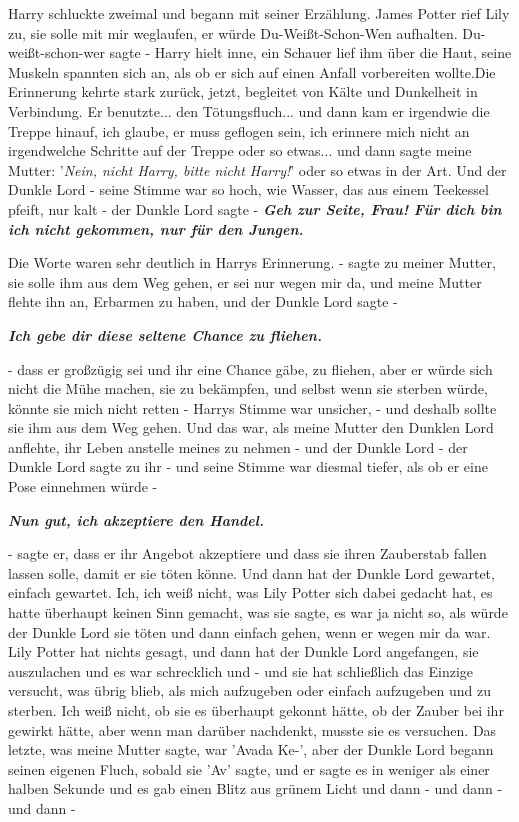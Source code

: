 Harry schluckte zweimal und begann mit seiner Erzählung. \glqq{}James Potter rief
Lily zu, sie solle mit mir weglaufen, er würde Du-Weißt-Schon-Wen aufhalten.
Du-weißt-schon-wer sagte -\grqq{} Harry hielt inne, ein Schauer lief ihm über
die Haut, seine Muskeln spannten sich an, als ob er sich auf einen Anfall
vorbereiten wollte.Die Erinnerung kehrte stark zurück, jetzt, begleitet von
Kälte und Dunkelheit in Verbindung. \glqq{}Er benutzte... den Tötungsfluch... und
dann kam er irgendwie die Treppe hinauf, ich glaube, er muss geflogen sein, ich
erinnere mich nicht an irgendwelche Schritte auf der Treppe oder so etwas... und
dann sagte meine Mutter: '\emph{Nein, nicht Harry, bitte nicht Harry!}' oder so
etwas in der Art. Und der Dunkle Lord - seine Stimme war so hoch, wie Wasser,
das aus einem Teekessel pfeift, nur kalt - der Dunkle Lord sagte\grqq{} -
\textbf{}
\textbf{\emph{Geh zur Seite, Frau! Für dich bin ich nicht gekommen, nur für den
Jungen.}}

Die Worte waren sehr deutlich in Harrys Erinnerung. \glqq{}- sagte zu meiner
Mutter, sie solle ihm aus dem Weg gehen, er sei nur wegen mir da, und meine
Mutter flehte ihn an, Erbarmen zu haben, und der Dunkle Lord sagte -\grqq{}

\textbf{\emph{Ich gebe dir diese seltene Chance zu fliehen.} }

\glqq{}- dass er großzügig sei und ihr eine Chance gäbe, zu fliehen, aber er
würde sich nicht die Mühe machen, sie zu bekämpfen, und selbst wenn sie sterben
würde, könnte sie mich nicht retten -\grqq{} Harrys Stimme war unsicher, \glqq{}-
und deshalb sollte sie ihm aus dem Weg gehen. Und das war, als meine Mutter den
Dunklen Lord anflehte, ihr Leben anstelle meines zu nehmen - und der Dunkle Lord
- der Dunkle Lord sagte zu ihr - und seine Stimme war diesmal tiefer, als ob er
eine Pose einnehmen würde -\grqq{}

\textbf{\emph{Nun gut, ich akzeptiere den Handel.}}

\glqq{}- sagte er, dass er ihr Angebot akzeptiere und dass sie ihren Zauberstab
fallen lassen solle, damit er sie töten könne. Und dann hat der Dunkle Lord
gewartet, einfach gewartet. Ich, ich weiß nicht, was Lily Potter sich dabei
gedacht hat, es hatte überhaupt keinen Sinn gemacht, was sie sagte, es war ja
nicht so, als würde der Dunkle Lord sie töten und dann einfach gehen, wenn er
wegen mir da war. Lily Potter hat nichts gesagt, und dann hat der Dunkle Lord
angefangen, sie auszulachen und es war schrecklich und - und sie hat schließlich
das Einzige versucht, was übrig blieb, als mich aufzugeben oder einfach
aufzugeben und zu sterben. Ich weiß nicht, ob sie es überhaupt gekonnt hätte, ob
der Zauber bei ihr gewirkt hätte, aber wenn man darüber nachdenkt, musste sie es
versuchen. Das letzte, was meine Mutter sagte, war 'Avada Ke-', aber der Dunkle
Lord begann seinen eigenen Fluch, sobald sie 'Av' sagte, und er sagte es in
weniger als einer halben Sekunde und es gab einen Blitz aus grünem Licht und
dann - und dann - und dann -\grqq{}

